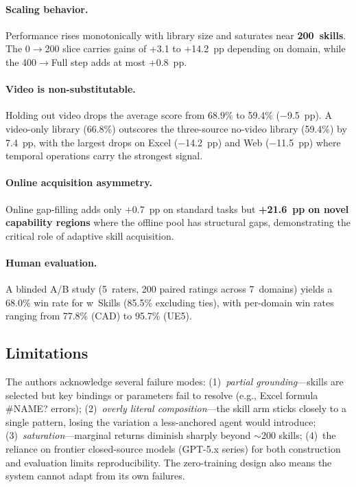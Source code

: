 \documentclass[11pt,a4paper]{article}
\begin{document}
\paragraph{Scaling behavior.}
Performance rises monotonically with library size and saturates near \textbf{200~skills}. The 0$\to$200 slice carries gains of +3.1 to +14.2~pp depending on domain, while the 400$\to$Full step adds at most +0.8~pp.

\paragraph{Video is non-substitutable.}
Holding out video drops the average score from 68.9\% to 59.4\% ($-$9.5~pp). A video-only library (66.8\%) outscores the three-source no-video library (59.4\%) by 7.4~pp, with the largest drops on Excel ($-$14.2~pp) and Web ($-$11.5~pp) where temporal operations carry the strongest signal.

\paragraph{Online acquisition asymmetry.}
Online gap-filling adds only +0.7~pp on standard tasks but \textbf{+21.6~pp on novel capability regions} where the offline pool has structural gaps, demonstrating the critical role of adaptive skill acquisition.

\paragraph{Human evaluation.}
A blinded A/B study (5~raters, 200 paired ratings across 7~domains) yields a 68.0\% win rate for w~Skills (85.5\% excluding ties), with per-domain win rates ranging from 77.8\% (CAD) to 95.7\% (UE5).

\subsection{Limitations}

The authors acknowledge several failure modes: (1)~\emph{partial grounding}---skills are selected but key bindings or parameters fail to resolve (e.g., Excel formula \#NAME? errors); (2)~\emph{overly literal composition}---the skill arm sticks closely to a single pattern, losing the variation a less-anchored agent would introduce; (3)~\emph{saturation}---marginal returns diminish sharply beyond $\sim$200 skills; (4)~the reliance on frontier closed-source models (GPT-5.x series) for both construction and evaluation limits reproducibility. The zero-training design also means the system cannot adapt from its own failures.
\end{document}
